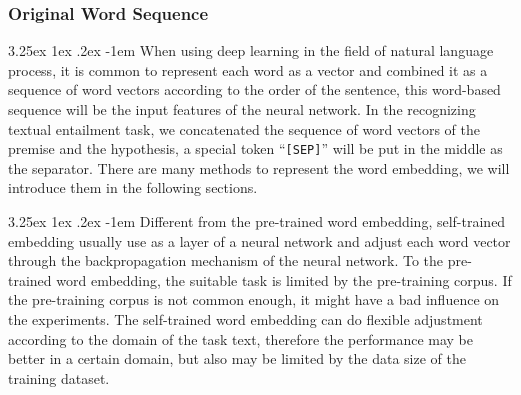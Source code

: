 \documentclass[12pt]{article}
\makeatletter
\newcounter{subsubsubsection}[subsubsection]
\renewcommand\paragraph{\@startsection{paragraph}{5}{\z@}%
  {3.25ex \@plus1ex \@minus.2ex}%
  {-1em}%
  {\normalfont\normalsize\bfseries}}
\makeatother
\begin{document}
\begin{CJK*}{UTF8}{bkai}
\begin{spacing}{1.77}
\subsubsection{Original Word Sequence} \label{section:word_embedding}
\paragraph{}
When using deep learning in the field of natural language process, it is common to represent each word as a vector and combined it as a sequence of word vectors according to the order of the sentence, this word-based sequence will be the input features of the neural network. In the recognizing textual entailment task, we concatenated the sequence of word vectors of the premise and the hypothesis, a special token ``\texttt{[SEP]}'' will be put in the middle as the separator. There are many methods to represent the word embedding, we will introduce them in the following sections.

\paragraph{}
Different from the pre-trained word embedding, self-trained embedding usually use as a layer of a neural network and adjust each word vector through the backpropagation mechanism of the neural network. To the pre-trained word embedding, the suitable task is limited by the pre-training corpus. If the pre-training corpus is not common enough, it might have a bad influence on the experiments. The self-trained word embedding can do flexible adjustment according to the domain of the task text, therefore the performance may be better in a certain domain, but also may be limited by the data size of the training dataset.


\end{spacing}
\end{CJK*}
\end{document}

